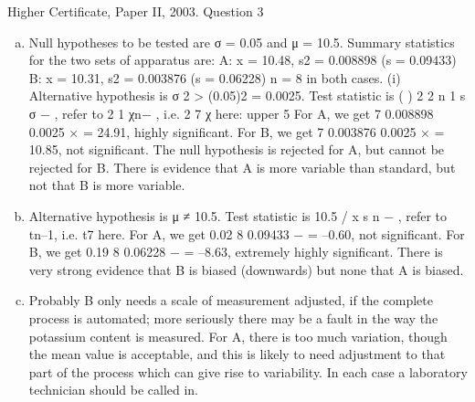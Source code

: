 \documentclass[a4paper,12pt]{article}
\begin{document}
Higher Certificate, Paper II, 2003. Question 3
\begin{enumerate}[(a)]
\item Null hypotheses to be tested are σ = 0.05 and μ = 10.5.
Summary statistics for the two sets of apparatus are:
A: x = 10.48, s2 = 0.008898 (s = 0.09433)
B: x = 10.31, s2 = 0.003876 (s = 0.06228)
n = 8 in both cases.
(i) Alternative hypothesis is σ 2 > (0.05)2 = 0.0025. Test statistic is ( ) 2
2
n 1 s
σ
−
,
refer to 2
1 χn− , i.e. 2
7 χ here: upper 5%
For A, we get 7 0.008898
0.0025
× = 24.91, highly significant. For B, we get
7 0.003876
0.0025
× = 10.85, not significant.
The null hypothesis is rejected for A, but cannot be rejected for B. There is
evidence that A is more variable than standard, but not that B is more variable.
\item  Alternative hypothesis is μ ≠ 10.5. Test statistic is 10.5
/
x
s n
− , refer to tn–1, i.e.
t7 here.
For A, we get 0.02 8
0.09433
− = –0.60, not significant. For B, we get 0.19 8
0.06228
− =
–8.63, extremely highly significant.
There is very strong evidence that B is biased (downwards) but none that A is
biased.
\item  Probably B only needs a scale of measurement adjusted, if the complete
process is automated; more seriously there may be a fault in the way the
potassium content is measured. For A, there is too much variation, though the
mean value is acceptable, and this is likely to need adjustment to that part of
the process which can give rise to variability. In each case a laboratory
technician should be called in.
\end{enumerate}
\end{document}
